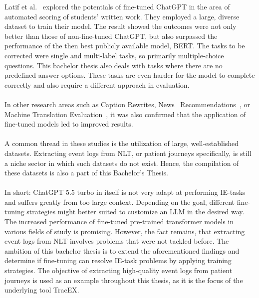 \newpage
Latif et al.~\cite{latif_fine-tuning_2024} explored the potentials of fine-tuned ChatGPT in the area of automated scoring of students' written work. They employed a large, diverse dataset to train their model. The result showed the outcomes were not only better than those of non-fine-tuned ChatGPT, but also surpassed the performance of the then best publicly available model, BERT. The tasks to be corrected were single and multi-label tasks, so primarily multiple-choice questions. This bachelor thesis also deals with tasks where there are no predefined answer options. These tasks are even harder for the model to complete correctly and also require a different approach in evaluation.\\\\
In other research areas such as Caption Rewrites, News~\cite{gladkoff_predictive_2023} Recommendations~\cite{li_exploring_2023}, or Machine Translation Evaluation~\cite{wang_mitigating_2023}, it was also confirmed that the application of fine-tuned models led to improved results.\\\\
A common thread in these studies is the utilization of large, well-established datasets. Extracting event logs from NLT, or patient journeys specifically, is still a niche sector in which such datasets do not exist. Hence, the compilation of these datasets is also a part of this Bachelor's Thesis.\\\\
In short: ChatGPT 5.5 turbo in itself is not very adapt at performing IE-tasks and suffers greatly from too large context. Depending on the goal, different fine-tuning strategies might better suited to customize an LLM in the desired way. The increased performance of fine-tuned pre-trained transformer models in various fields of study is promising. However, the fact remains, that extracting event logs from NLT involves problems that were not tackled before. The ambition of this bachelor thesis is to extend the aforementioned findings and determine if fine-tuning can resolve IE-task problems by applying training strategies. The objective of extracting high-quality event logs from patient journeys is used as an example throughout this thesis, as it is the focus of the underlying tool TracEX.